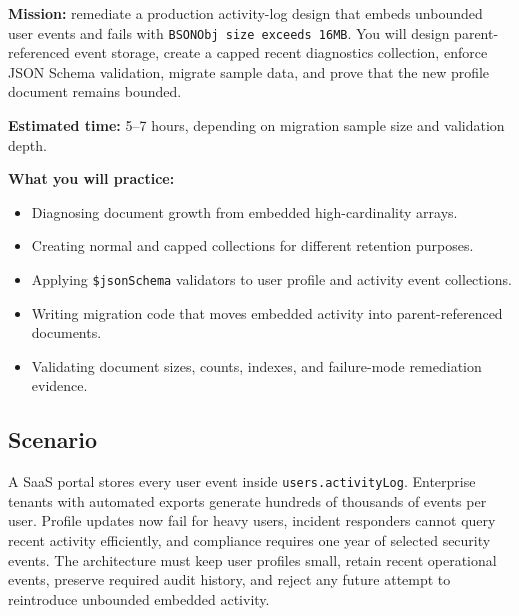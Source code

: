 \begin{capstonebox}
\textbf{Mission:} remediate a production activity-log design that embeds unbounded user events and fails with \texttt{BSONObj size exceeds 16MB}. You will design parent-referenced event storage, create a capped recent diagnostics collection, enforce JSON Schema validation, migrate sample data, and prove that the new profile document remains bounded.

\textbf{Estimated time:} 5--7 hours, depending on migration sample size and validation depth.

\textbf{What you will practice:}
\begin{itemize}
    \item Diagnosing document growth from embedded high-cardinality arrays.
    \item Creating normal and capped collections for different retention purposes.
    \item Applying \texttt{\$jsonSchema} validators to user profile and activity event collections.
    \item Writing migration code that moves embedded activity into parent-referenced documents.
    \item Validating document sizes, counts, indexes, and failure-mode remediation evidence.
\end{itemize}
\end{capstonebox}

\subsection*{Scenario}
A SaaS portal stores every user event inside \texttt{users.activityLog}. Enterprise tenants with automated exports generate hundreds of thousands of events per user. Profile updates now fail for heavy users, incident responders cannot query recent activity efficiently, and compliance requires one year of selected security events. The architecture must keep user profiles small, retain recent operational events, preserve required audit history, and reject any future attempt to reintroduce unbounded embedded activity.

